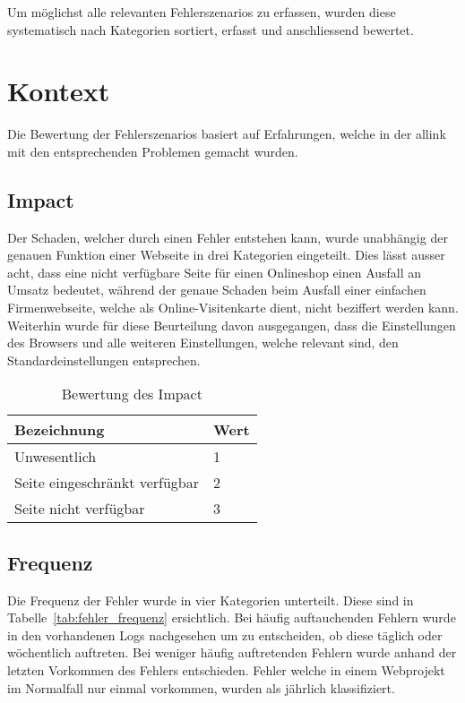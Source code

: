 
Um möglichst alle relevanten Fehlerszenarios zu erfassen, wurden diese systematisch nach Kategorien sortiert, erfasst und anschliessend bewertet.

\section{Kontext}
\label{sec:kontext}
Die Bewertung der Fehlerszenarios basiert auf Erfahrungen, welche in der allink mit den entsprechenden Problemen gemacht wurden.

\makeatletter
{} \setcounter{fnumber}{0}
\renewcommand\thefnumber{F\arabic{fnumber}}
\newcommand{\newfnumber}[5]%
{%
\midrule%
\refstepcounter{fnumber}%
\expandafter\xdef\csname f#2\endcsname {#1}%
\thefnumber\label{f:#2} & #1 & #3 & #4 & #5 \\
}
\makeatother

\subsection{Impact}
\label{sub:impact}
Der Schaden, welcher durch einen Fehler entstehen kann, wurde unabhängig der genauen Funktion einer Webseite in drei Kategorien eingeteilt. Dies lässt ausser acht, dass eine nicht verfügbare Seite für einen Onlineshop einen Ausfall an Umsatz bedeutet, während der genaue Schaden beim Ausfall einer einfachen Firmenwebseite, welche als Online-Visitenkarte dient, nicht beziffert werden kann. Weiterhin wurde für diese Beurteilung davon ausgegangen, dass die Einstellungen des Browsers und alle weiteren Einstellungen, welche relevant sind, den Standardeinstellungen entsprechen.

\begin{table}[h!]
  \centering
  \begin{tabular}{ll}
  \toprule
    Bezeichnung & Wert\\
  \hline
    Unwesentlich & 1\\
  \hline
    Seite eingeschränkt verfügbar & 2\\
  \hline
    Seite nicht verfügbar & 3\\
  \bottomrule
  \end{tabular}
  \caption{Bewertung des Impact}
  \label{tab:impact}
\end{table}

\subsection{Frequenz}
\label{sub:frequenz}
Die Frequenz der Fehler wurde in vier Kategorien unterteilt. Diese sind in Tabelle~\ref{tab:fehler_frequenz} ersichtlich. Bei häufig auftauchenden Fehlern wurde in den vorhandenen Logs nachgesehen um zu entscheiden, ob diese täglich oder wöchentlich auftreten. Bei weniger häufig auftretenden Fehlern wurde anhand der letzten Vorkommen des Fehlers entschieden. Fehler welche in einem Webprojekt im Normalfall nur einmal vorkommen, wurden als jährlich klassifiziert.

